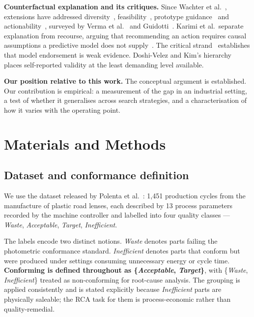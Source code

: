 \documentclass[11pt,a4paper]{article}
\begin{document}
\textbf{Counterfactual explanation and its critiques.} Since Wachter et al.~\cite{wachter2018}, extensions have addressed diversity~\cite{mothilal2020}, feasibility~\cite{poyiadzi2020}, prototype guidance~\cite{vanlooveren2021} and actionability~\cite{ustun2019}, surveyed by Verma et al.~\cite{verma2024} and Guidotti~\cite{guidotti2024}. Karimi et al.\ separate explanation from recourse, arguing that recommending an action requires causal assumptions a predictive model does not supply~\cite{karimi2021}. The critical strand~\cite{laugel2019,alvarezmelis2018,slack2020,krishna2022,adebayo2018} establishes that model endorsement is weak evidence. Doshi-Velez and Kim's hierarchy~\cite{doshivelez2017} places self-reported validity at the least demanding level available.

\textbf{Our position relative to this work.} The conceptual argument is established. Our contribution is empirical: a measurement of the gap in an industrial setting, a test of whether it generalises across search strategies, and a characterisation of how it varies with the operating point.

\section{Materials and Methods}

\subsection{Dataset and conformance definition}

We use the dataset released by Polenta et al.~\cite{polenta2022}: 1{,}451 production cycles from the manufacture of plastic road lenses, each described by 13 process parameters recorded by the machine controller and labelled into four quality classes --- \emph{Waste}, \emph{Acceptable}, \emph{Target}, \emph{Inefficient}.

The labels encode two distinct notions. \emph{Waste} denotes parts failing the photometric conformance standard. \emph{Inefficient} denotes parts that conform but were produced under settings consuming unnecessary energy or cycle time. \textbf{Conforming is defined throughout as \{\emph{Acceptable}, \emph{Target}\}}, with \{\emph{Waste}, \emph{Inefficient}\} treated as non-conforming for root-cause analysis. The grouping is applied consistently and is stated explicitly because \emph{Inefficient} parts are physically saleable; the RCA task for them is process-economic rather than quality-remedial.
\end{document}
